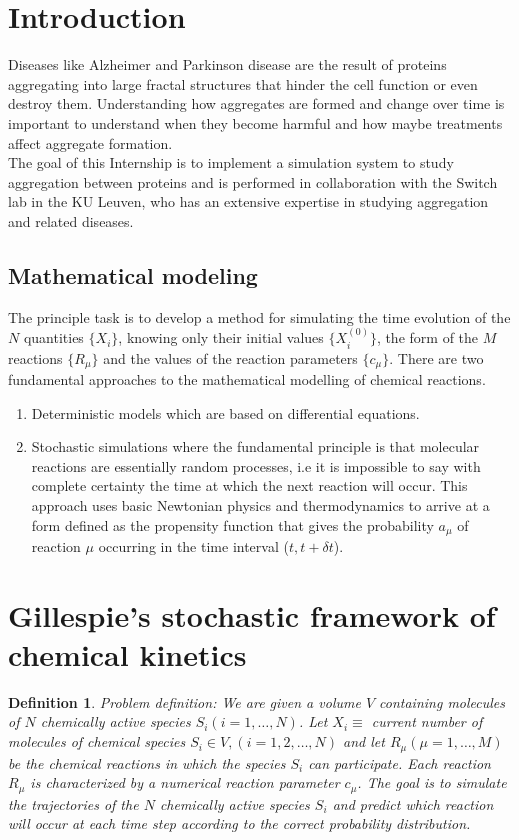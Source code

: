 \documentclass[11pt,a4paper]{article}
\newtheorem{defn}[theorem]{Definition}
\begin{document}


\tableofcontents \pagebreak

\section{Introduction}
Diseases like Alzheimer and Parkinson disease are the result of proteins aggregating into large fractal structures that hinder the cell function or even destroy them. Understanding how aggregates are formed and change over time is important to understand when they become harmful and how maybe treatments affect aggregate formation. \\

The goal of this Internship is to implement a simulation system to study aggregation between proteins and is performed in collaboration with the Switch lab in the KU Leuven, who has an extensive expertise in studying aggregation and related diseases.

\subsection{Mathematical modeling}
The principle task is to develop a method for simulating the time evolution of the $N$ quantities $\{X_{i}\}$, knowing only their initial values $\{X_{i}^{(0)}\}$, the form of the $M$ reactions $\{R_{\mu}\}$ and the values of the reaction parameters $\{c_{\mu}\}$.
There are two fundamental approaches to the mathematical modelling of chemical reactions.
\begin{enumerate}
  \item Deterministic models which are based on differential equations.
  \item Stochastic simulations where the fundamental principle is that molecular reactions are essentially random processes, i.e it is impossible to say with complete certainty the time at which the next reaction will occur. This approach uses basic Newtonian physics and thermodynamics to arrive at a form defined as the propensity function that gives the probability $a_\mu$ of reaction $\mu$ occurring in the time interval ($t, t+\delta t$).
\end{enumerate}

\section{Gillespie's stochastic framework of chemical kinetics}
\begin{defn}{Problem definition:}
We are given a volume $V$ containing molecules of $N$ chemically active species $S_{i}(i = 1, \dots, N)$. Let $X_{i} \equiv$ current number of molecules of chemical species $S_{i} \in V, (i = 1, 2, \dots, N)$ and let $R_{\mu} (\mu = 1, \dots, M)$ be the chemical reactions in which the species $S_{i}$ can participate. Each reaction $R_{\mu}$ is characterized by a numerical reaction parameter $c_{\mu}$. The goal is to simulate the trajectories of the $N$ chemically active species $S_i$ and predict which reaction will occur at each time step according to the correct probability distribution.
\end{defn}
\end{document}
